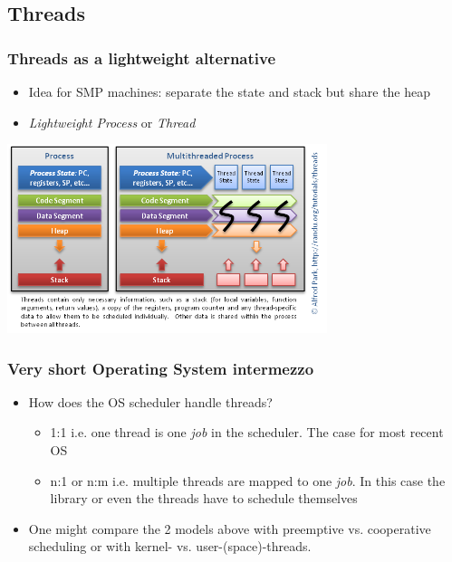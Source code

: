 \documentclass[10pt]{beamer}
\begin{document}
\subsection{Threads}
        
\begin{frame}
        \frametitle{Threads as a lightweight alternative}
        \begin{itemize}
                \item Idea for SMP machines: separate the state and stack but share the heap
                \item \emph{Lightweight Process} or \emph{Thread}
        \end{itemize}
                \includegraphics[width=0.7\textwidth]{pictures/process.png}
\end{frame}


\begin{frame}
        \frametitle{Very short Operating System intermezzo}
        \begin{itemize}
                \item How does the OS scheduler handle threads?
                \begin{itemize}
                        \item 1:1 i.e. one thread is one \emph{job} in the scheduler. The case for most recent OS
                        \item n:1 or n:m i.e. multiple threads are mapped to one \emph{job}. In this case the library or even the threads have to schedule themselves
                \end{itemize}
                \item One might compare the 2 models above with preemptive vs. cooperative scheduling or with kernel- vs. user-(space)-threads.
        \end{itemize}
\end{frame}
\end{document}
